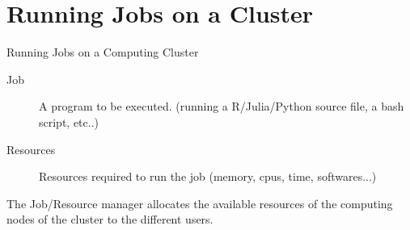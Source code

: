 \documentclass{beamer}
\begin{document}
\section{Running Jobs on a Cluster}
\begin{frame}{Running Jobs on a Computing Cluster}
  \begin{figure}
  \end{figure}
  \begin{description}
    \item[Job] A program to be executed. (running a R/Julia/Python source file, a bash script, etc..)
    \item[Resources] Resources required to run the job (memory, cpus, time, softwares...)
  \end{description}
  The Job/Resource manager allocates the available resources of the computing nodes of the cluster to the different users.
\end{frame}
\end{document}
